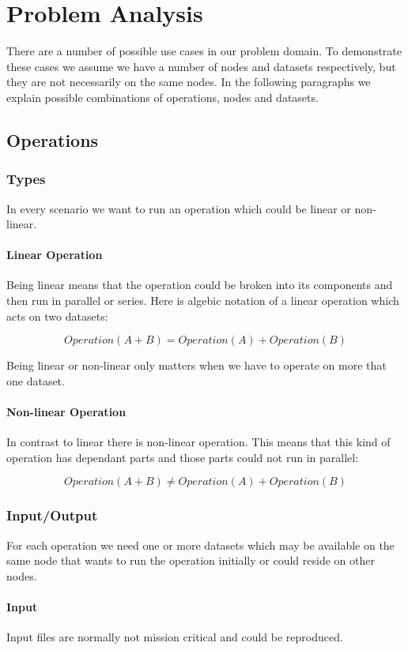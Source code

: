 \chapter{Problem Analysis}
\label{cha:analysis}

There are a number of possible use cases in our problem domain. To demonstrate these cases we assume
we have a number of nodes and datasets respectively, but they are not necessarily on the same nodes.
In the following paragraphs we explain possible combinations of operations, nodes and datasets.

\section{Operations}
\subsection{Types}
In every scenario we want to run an operation which could be linear or non-linear.

\subsubsection{Linear Operation}
Being linear means that the operation
could be broken into its components and then run in parallel or series. Here is algebic notation
of a linear operation which acts on two datasets:

\[ Operation(A + B) = Operation(A) + Operation(B) \]

Being linear or non-linear only matters when we have to operate on more that one dataset.

\subsubsection{Non-linear Operation}
In contrast to linear there is non-linear operation. This means that this kind of operation has dependant parts and
those parts could not run in parallel:

\[ Operation(A + B) \neq Operation(A) + Operation(B) \]

\subsection{Input/Output}
For each operation we need one or more datasets which may be available on the same node that wants to run the operation
initially or could reside on other nodes. 

\subsubsection{Input}
Input files are normally not mission critical and could be reproduced.

